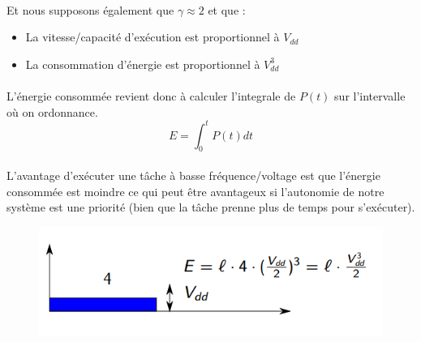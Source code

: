 \paragraph{}
Et nous supposons également que $\gamma \approx 2$ et que :
\begin{itemize}
\item La vitesse/capacité d'exécution est proportionnel à $V_{dd}$
\item La consommation d'énergie est proportionnel à $V_{dd}^3$
\end{itemize}
\paragraph{}
L'énergie consommée revient donc à calculer l'integrale de $P(t)$ sur l'intervalle où on ordonnance.
\begin{equation*}
E = \int_{0}^{t} P(t) dt
\end{equation*}
\paragraph{}
L'avantage d'exécuter une tâche à basse fréquence/voltage est que l'énergie consommée est moindre ce qui peut être avantageux si l'autonomie de notre système est une priorité (bien que la tâche prenne plus de temps pour s'exécuter).
\begin{figure}[H]
\centering
\includegraphics{img_6_1__0}
\end{figure}

